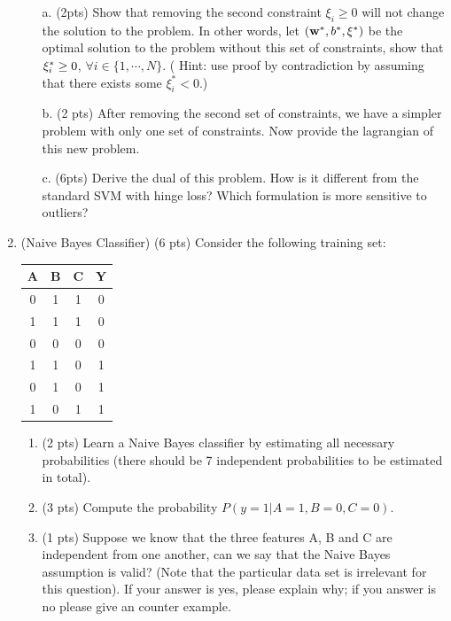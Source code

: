 \documentclass{article}
\def\w{{\bf w}}
\begin{document}
\begin{enumerate}
\begin{itemize}
\item [a.] (2pts) Show that removing the second constraint $\xi_i\geq 0$ will 
not change the solution to the problem. In other words, let 
$(\w^*, b^*, {\bf \xi}^*)$ be the optimal solution to the problem without this 
set of constraints, show that  
${\bf \xi}_i^* \geq 0$, $\forall i\in\{1,\cdots,N\} $. 
( Hint: use proof by contradiction by assuming that there exists 
some $\xi_i^*<0$.)\\

\item [b.] (2 pts) After removing the second set of constraints, we have a 
simpler problem with only one set of constraints. Now provide the lagrangian of 
this new problem.\\
\item [c.] (6pts) Derive the dual of this problem. How is it different from the 
standard SVM with hinge loss? Which formulation is more sensitive to outliers?\\

\end{itemize}
\item (Naive Bayes Classifier) (6 pts) Consider the following training set:
\begin{center}
\begin{tabular}{|c|c|c|c|}\hline
A&B&C&Y\\ \hline
0&1&1&0 \\ \hline
1&1&1&0 \\ \hline
0&0&0&0 \\ \hline
1&1&0&1 \\ \hline
0&1&0&1 \\ \hline
1&0&1&1 \\ \hline
\end{tabular}
\end{center}
\begin{enumerate}
\item (2 pts) Learn a Naive Bayes classifier by estimating
all necessary probabilities (there should be 7 independent probabilities to be 
estimated in total).

\item (3 pts) Compute the probability $P(y=1|A=1, B=0, C=0)$.
\item (1 pts) Suppose we know that the three features A, B and C are independent 
from one another, can we say that the Naive Bayes assumption is valid? (Note 
that the particular data set is irrelevant for this question). If your answer 
is yes, please explain why; if you answer is no please give an counter example.


\end{enumerate}
\end{enumerate}
\end{document}

